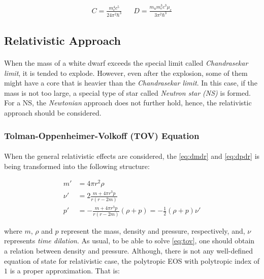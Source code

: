 \documentclass[letterpaper,12pt]{article}
\begin{document}
\begin{align*}
    C = \frac{m_e^4 c^5}{24\pi^2\hbar^3} & \; \; \; D = \frac{m_u m_e^3 c^3 \mu_e}{3 \pi^2 \hbar^3}
\end{align*}


\subsection{Relativistic Approach}

\paragraph{} When the mass of a white dwarf exceeds the special limit called \textit{Chandrasekar limit}, it is tended to explode. However, even after the explosion, some of them might have a core that is heavier than the \textit{Chandrasekar limit}. In this case, if the mass is not too large, a special type of star called \textit{Neutron star (NS)} is formed. For a NS, the \textit{Newtonian} approach does not further hold, hence, the relativistic approach should be considered.

\subsubsection{Tolman-Oppenheimer-Volkoff (TOV) Equation}
\label{sec:tov}
\paragraph{} When the general relativistic effects are considered, the \eqref{eq:dmdr} and \eqref{eq:dpdr} is being transformed into the following structure:

\begin{equation}
\begin{aligned}
    \label{eq:tov}
    m' &= 4 \pi r^2 \rho \\
    \nu' &= 2 \frac{m + 4 \pi r^3 p}{r \left(r - 2m\right)} \\
    p' &= -\frac{m + 4 \pi r^3 p}{r \left(r - 2m\right)} \left(\rho + p\right) = -\frac{1}{2}\left(\rho + p\right)\nu'
\end{aligned}
\end{equation}

where $m$, $\rho$ and $p$ represent the mass, density and pressure, respectively, and, $\nu$ represents \textit{time dilation}. As usual, to be able to solve \eqref{eq:tov}, one should obtain a relation between density and pressure. Although, there is not any well-defined equation of state for relativistic case, the polytropic EOS with polytropic index of $1$ is a proper approximation. That is:
\end{document}
